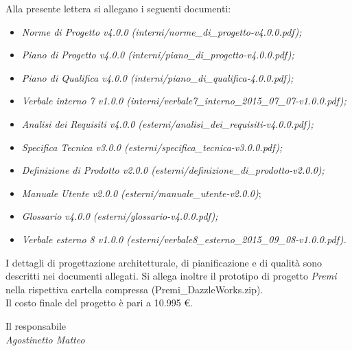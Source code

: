 \noindent Alla presente lettera si allegano i seguenti documenti:
\begin{itemize}
	\item \textit{Norme di Progetto v4.0.0 (interni/norme\_di\_progetto-v4.0.0.pdf);}
	\item \textit{Piano di Progetto v4.0.0 (interni/piano\_di\_progetto-v4.0.0.pdf);}
	\item \textit{Piano di Qualifica v4.0.0 (interni/piano\_di\_qualifica-4.0.0.pdf);}
	\item \textit{Verbale interno 7 v1.0.0 (interni/verbale7\_interno\_2015\_07\_07-v1.0.0.pdf);} 
	\item \textit{Analisi dei Requisiti v4.0.0 (esterni/analisi\_dei\_requisiti-v4.0.0.pdf);}
	\item \textit{Specifica Tecnica v3.0.0 (esterni/specifica\_tecnica-v3.0.0.pdf);}
	\item \textit{Definizione di Prodotto v2.0.0 (esterni/definizione\_di\_prodotto-v2.0.0);}
	\item \textit{Manuale Utente v2.0.0 (esterni/manuale\_utente-v2.0.0)};
	\item \textit{Glossario v4.0.0 (esterni/glossario-v4.0.0.pdf);}
	\item \textit{Verbale esterno 8 v1.0.0 (esterni/verbale8\_esterno\_2015\_09\_08-v1.0.0.pdf).}\\
\end{itemize}
I dettagli di progettazione architetturale, di pianificazione e di qualità sono descritti nei documenti allegati.
Si allega inoltre il prototipo di progetto \textit{Premi} nella rispettiva cartella compressa (Premi\_DazzleWorks.zip).\\

\noindent Il costo finale del progetto è pari a 10.995 €.

\begin{flushright}
	Il responsabile\\
	\textit{Agostinetto Matteo}
\end{flushright}